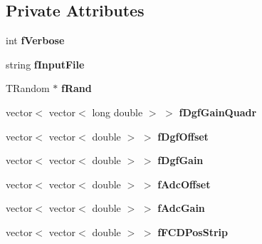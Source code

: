 \subsection*{Private Attributes}
\begin{DoxyCompactItemize}
\item 
\hypertarget{class_calibration_a96000e6eb797044f6f1953c057e85003}{int {\bfseries f\-Verbose}}\label{class_calibration_a96000e6eb797044f6f1953c057e85003}

\item 
\hypertarget{class_calibration_a5072ba7d40908bb42829ff655b94abbe}{string {\bfseries f\-Input\-File}}\label{class_calibration_a5072ba7d40908bb42829ff655b94abbe}

\item 
\hypertarget{class_calibration_ac2ea5e39b43d6cfd913a75b2bf97ce9b}{T\-Random $\ast$ {\bfseries f\-Rand}}\label{class_calibration_ac2ea5e39b43d6cfd913a75b2bf97ce9b}

\item 
\hypertarget{class_calibration_a7581e622bc7cc336e1c328335c7580dc}{vector$<$ vector$<$ long double $>$ $>$ {\bfseries f\-Dgf\-Gain\-Quadr}}\label{class_calibration_a7581e622bc7cc336e1c328335c7580dc}

\item 
\hypertarget{class_calibration_ada08b4d5b7debaade1f0253c37246a91}{vector$<$ vector$<$ double $>$ $>$ {\bfseries f\-Dgf\-Offset}}\label{class_calibration_ada08b4d5b7debaade1f0253c37246a91}

\item 
\hypertarget{class_calibration_a85ccd2f929fa2868b82fe24f492dface}{vector$<$ vector$<$ double $>$ $>$ {\bfseries f\-Dgf\-Gain}}\label{class_calibration_a85ccd2f929fa2868b82fe24f492dface}

\item 
\hypertarget{class_calibration_ace07432ae8989b8309754d84a9d7e91e}{vector$<$ vector$<$ double $>$ $>$ {\bfseries f\-Adc\-Offset}}\label{class_calibration_ace07432ae8989b8309754d84a9d7e91e}

\item 
\hypertarget{class_calibration_a0ee2c053390f1400db656aeed6d609ce}{vector$<$ vector$<$ double $>$ $>$ {\bfseries f\-Adc\-Gain}}\label{class_calibration_a0ee2c053390f1400db656aeed6d609ce}

\item 
\hypertarget{class_calibration_aa180b606b811ac4bd8a2db517c5302a3}{vector$<$ vector$<$ double $>$ $>$ {\bfseries f\-F\-C\-D\-Pos\-Strip}}\label{class_calibration_aa180b606b811ac4bd8a2db517c5302a3}


\end{DoxyCompactItemize}
